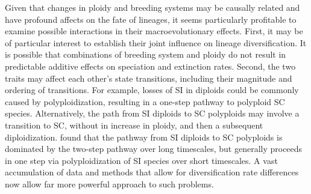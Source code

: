 Given that changes in ploidy and breeding systems may be causally related and have profound affects on the fate of lineages, it seems particularly profitable to examine possible interactions in their macroevolutionary effects.
First, it may be of particular interest to establish their joint influence on lineage diversification.
It is possible that combinations of breeding system and ploidy do not result in predictable additive effects on speciation and extinction rates.
Second, the two traits may affect each other's state transitions, including their magnitude and ordering of transitions.
For example, losses of SI in diploids could be commonly caused by polyploidization, resulting in a one-step pathway to polyploid SC species. 
Alternatively, the path from SI diploids to SC polyploids may involve a transition to SC, without in increase in ploidy, and then a subsequent diploidization. 
\citet{robertson_2011} found that the pathway from SI diploids to SC polyploids is dominated by the two-step pathway over long timescales, but generally proceeds in one step via polyploidization of SI species over short timescales.
A vast accumulation of data and methods that allow for diversification rate differences now allow far more powerful approach to such problems.

